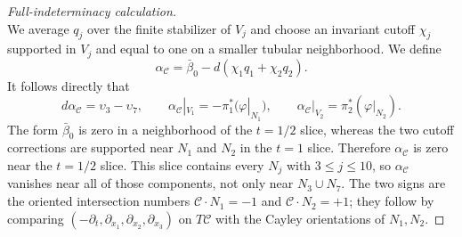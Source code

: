 \documentclass[11pt]{article}
\theoremstyle{remark}\newtheorem{remark}[theorem]{Remark}
\begin{document}
\begin{proof}[Full-indeterminacy calculation]
\[\]
We average $q_j$ over the finite stabilizer of $V_j$ and choose an
invariant cutoff $\chi_j$ supported in $V_j$ and equal to one on a smaller
tubular neighborhood.  We define
\[
 \alpha_{\mathcal C}
 =\bar\beta_0-d(\chi_1q_1+\chi_2q_2).
\]
It follows directly that
\begin{equation}\label{eq:cobordism-primitive}
 d\alpha_{\mathcal C}=\upsilon_3-\upsilon_7,\qquad
 \alpha_{\mathcal C}|_{V_1}=-\pi_1^*(\varphi|_{N_1}),\qquad
 \alpha_{\mathcal C}|_{V_2}= \pi_2^*(\varphi|_{N_2}).
\end{equation}
The form $\bar\beta_0$ is zero in a neighborhood of the $t=1/2$ slice,
whereas the two cutoff corrections are supported near $N_1$ and $N_2$ in
the $t=1$ slice.  Therefore $\alpha_{\mathcal C}$ is zero near the
$t=1/2$ slice.  This slice contains every $N_j$ with
$3\leq j\leq10$, so
$\alpha_{\mathcal C}$ vanishes near all of those components, not only near
$N_3\cup N_7$.
The two signs are the oriented intersection numbers
$\mathcal C\cdot N_1=-1$ and $\mathcal C\cdot N_2=+1$; they follow by
comparing
$(-\partial_t,\partial_{x_1},\partial_{x_2},\partial_{x_3})$ on
$T\mathcal C$ with the Cayley orientations of $N_1,N_2$.


\end{proof}
\end{document}
